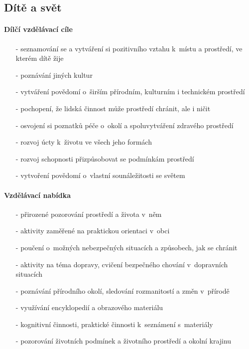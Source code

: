 			\subsection{Dítě a svět}
				\textit{} \citep[s.~29]{RVP}

				\paragraph{Dílčí vzdělávací cíle}

				\begin{itemize}
				\setlength\itemsep{-2mm}
					\item[-]seznamování se a vytváření si pozitivního vztahu k~místu a prostředí, ve kterém dítě žije
					\item[-]poznávání jiných kultur
					\item[-]vytváření povědomí o~širším přírodním, kulturním i technickém prostředí
					\item[-]pochopení, že lidská činnost může prostředí chránit, ale i ničit
					\item[-]osvojení si poznatků péče o~okolí a spoluvytváření zdravého prostředí
					\item[-]rozvoj úcty k~životu ve všech jeho formách
					\item[-]rozvoj schopnosti přizpůsobovat se podmínkám prostředí
					\item[-]vytvoření povědomí o~vlastní sounáležitosti se světem
				\end{itemize}
				
				\paragraph{Vzdělávací nabídka}

				\begin{itemize}
				\setlength\itemsep{-2mm}
					\item[-]přirozené pozorování prostředí a života v~něm
					\item[-]aktivity zaměřené na praktickou orientaci v~obci
					\item[-]poučení o~možných nebezpečných situacích a způsobech, jak se chránit
					\item[-]aktivity na téma dopravy, cvičení bezpečného chování v~dopravních situacích
					\item[-]poznávání přírodního okolí, sledování rozmanitostí a změn v~přírodě
					\item[-]využívání encyklopedií a obrazového materiálu
					\item[-]kognitivní činnosti, praktické činnosti k~seznámení s~materiály
					\item[-]pozorování životních podmínek a životního prostředí a okolní krajinu
				\end{itemize}
				
